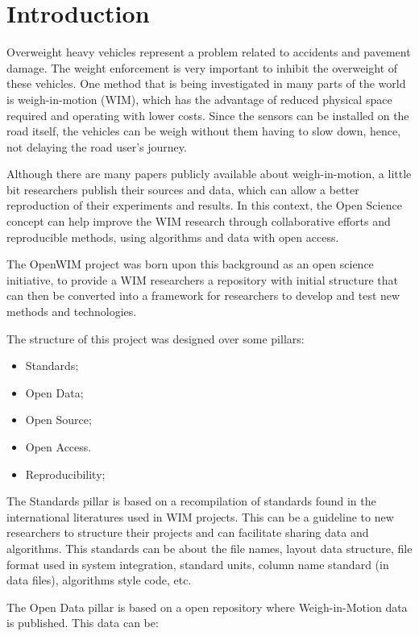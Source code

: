 \documentclass[a4paper]{article}
\begin{document}
\section{Introduction}
{

Overweight heavy vehicles represent a problem related to accidents and pavement damage. The weight enforcement is very important to inhibit the overweight of these vehicles. One method that is being investigated in many parts of the world is weigh-in-motion (WIM), which has the advantage of reduced physical space required and operating with lower costs. Since the sensors can be installed on the road itself, the vehicles can be weigh without them having to slow down, hence, not delaying the road user’s journey.

Although there are many papers publicly available about weigh-in-motion, a little bit researchers publish their sources and data, which can allow a better reproduction of their experiments and results. In this context, the Open Science concept can help improve the WIM research through collaborative efforts and reproducible methods, using algorithms and data with open access.

The OpenWIM project was born upon this background as an open science initiative, to provide a WIM researchers a repository with initial structure that can then be converted into a framework for researchers to develop and test new methods and technologies.

The structure of this project was designed over some pillars:
\begin{itemize}
\item Standards;
\item Open Data;
\item Open Source;
\item Open Access.
\item Reproducibility;
\end{itemize}

The Standards pillar is based on a recompilation of standards found in the international literatures used in WIM projects. This can be a guideline to new researchers to structure their projects and can facilitate sharing data and algorithms. This standards can be about the file names, layout data structure, file format used in system integration, standard units, column name standard (in data files), algorithms style code, etc.

The Open Data pillar is based on a open repository where Weigh-in-Motion data is published. This data can be:

}
\end{document}
